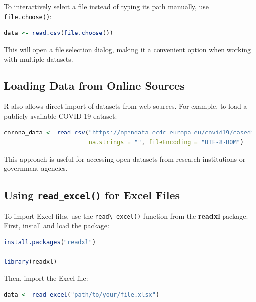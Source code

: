 \documentclass[
]{book}
\newcommand{\passthrough}[1]{#1}
\theoremstyle{definition}
\theoremstyle{definition}
\theoremstyle{definition}
\theoremstyle{definition}
\theoremstyle{remark}
\begin{document}
To interactively select a file instead of typing its path manually, use \passthrough{\lstinline!file.choose()!}:

\begin{lstlisting}[language=R]
data <- read.csv(file.choose())
\end{lstlisting}

This will open a file selection dialog, making it a convenient option when working with multiple datasets.

\subsection*{Loading Data from Online Sources}\label{loading-data-from-online-sources}

R also allows direct import of datasets from web sources. For example, to load a publicly available COVID-19 dataset:

\begin{lstlisting}[language=R]
corona_data <- read.csv("https://opendata.ecdc.europa.eu/covid19/casedistribution/csv", 
                        na.strings = "", fileEncoding = "UTF-8-BOM")
\end{lstlisting}

This approach is useful for accessing open datasets from research institutions or government agencies.

\subsection*{\texorpdfstring{Using \texttt{read\_excel()} for Excel Files}{Using read\_excel() for Excel Files}}\label{using-read_excel-for-excel-files}

To import Excel files, use the \passthrough{\lstinline!read\_excel()!} function from the \textbf{readxl} package. First, install and load the package:

\begin{lstlisting}[language=R]
install.packages("readxl")

library(readxl)
\end{lstlisting}

Then, import the Excel file:

\begin{lstlisting}[language=R]
data <- read_excel("path/to/your/file.xlsx")
\end{lstlisting}
\end{document}
